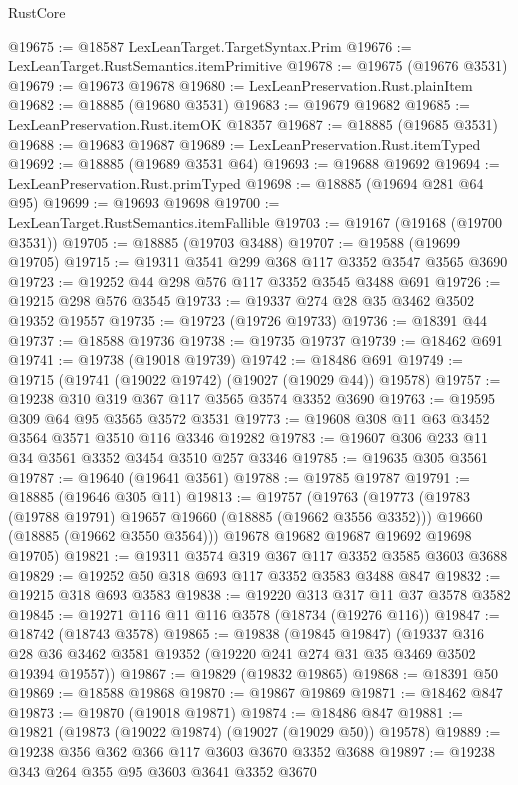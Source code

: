 \begin{lexlean}{RustCore}
\begin{coremodule}
@19675 := @18587 LexLeanTarget.TargetSyntax.Prim
@19676 := LexLeanTarget.RustSemantics.itemPrimitive
@19678 := @19675 (@19676 @3531)
@19679 := @19673 @19678
@19680 := LexLeanPreservation.Rust.plainItem
@19682 := @18885 (@19680 @3531)
@19683 := @19679 @19682
@19685 := LexLeanPreservation.Rust.itemOK @18357
@19687 := @18885 (@19685 @3531)
@19688 := @19683 @19687
@19689 := LexLeanPreservation.Rust.itemTyped
@19692 := @18885 (@19689 @3531 @64)
@19693 := @19688 @19692
@19694 := LexLeanPreservation.Rust.primTyped
@19698 := @18885 (@19694 @281 @64 @95)
@19699 := @19693 @19698
@19700 := LexLeanTarget.RustSemantics.itemFallible
@19703 := @19167 (@19168 (@19700 @3531))
@19705 := @18885 (@19703 @3488)
@19707 := @19588 (@19699 @19705)
@19715 := @19311 @3541 @299 @368 @117 @3352 @3547 @3565 @3690
@19723 := @19252 @44 @298 @576 @117 @3352 @3545 @3488 @691
@19726 := @19215 @298 @576 @3545
@19733 := @19337 @274 @28 @35 @3462 @3502 @19352 @19557
@19735 := @19723 (@19726 @19733)
@19736 := @18391 @44
@19737 := @18588 @19736
@19738 := @19735 @19737
@19739 := @18462 @691
@19741 := @19738 (@19018 @19739)
@19742 := @18486 @691
@19749 := @19715 (@19741 (@19022 @19742) (@19027 (@19029 @44)) @19578)
@19757 := @19238 @310 @319 @367 @117 @3565 @3574 @3352 @3690
@19763 := @19595 @309 @64 @95 @3565 @3572 @3531
@19773 := @19608 @308 @11 @63 @3452 @3564 @3571 @3510 @116 @3346 @19282
@19783 := @19607 @306 @233 @11 @34 @3561 @3352 @3454 @3510 @257 @3346
@19785 := @19635 @305 @3561
@19787 := @19640 (@19641 @3561)
@19788 := @19785 @19787
@19791 := @18885 (@19646 @305 @11)
@19813 := @19757
    (@19763
      (@19773
        (@19783 (@19788 @19791) @19657 @19660 (@18885 (@19662 @3556 @3352)))
        @19660
        (@18885 (@19662 @3550 @3564)))
      @19678
      @19682
      @19687
      @19692
      @19698
      @19705)
@19821 := @19311 @3574 @319 @367 @117 @3352 @3585 @3603 @3688
@19829 := @19252 @50 @318 @693 @117 @3352 @3583 @3488 @847
@19832 := @19215 @318 @693 @3583
@19838 := @19220 @313 @317 @11 @37 @3578 @3582
@19845 := @19271 @116 @11 @116 @3578 (@18734 (@19276 @116))
@19847 := @18742 (@18743 @3578)
@19865 := @19838
    (@19845 @19847)
    (@19337 @316 @28 @36 @3462 @3581 @19352 (@19220 @241 @274 @31 @35 @3469 @3502 @19394 @19557))
@19867 := @19829 (@19832 @19865)
@19868 := @18391 @50
@19869 := @18588 @19868
@19870 := @19867 @19869
@19871 := @18462 @847
@19873 := @19870 (@19018 @19871)
@19874 := @18486 @847
@19881 := @19821 (@19873 (@19022 @19874) (@19027 (@19029 @50)) @19578)
@19889 := @19238 @356 @362 @366 @117 @3603 @3670 @3352 @3688
@19897 := @19238 @343 @264 @355 @95 @3603 @3641 @3352 @3670

\end{coremodule}
\end{lexlean}
